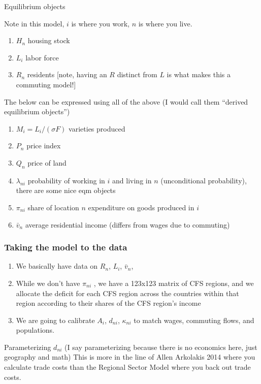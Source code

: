 \documentclass{article}
\begin{document}
Equilibrium objects

Note in this model, $i$ is where you work, $n$ is where you live.
\begin{enumerate}
\item $H_n$ housing stock
\item $L_i$ labor force
\item $R_n$ residents [note, having an $R$ distinct from $L$ is what makes this a commuting model!]
\end{enumerate}

The below can be expressed using all of the above (I would call them ``derived equilibrium objects'')
\begin{enumerate}
\item $M_i = L_i/(\sigma F)$ varieties produced
\item $P_n$ price index
\item $Q_n$ price of land
\item $\lambda_{ni}$ probability of working in $i$ and living in $n$ (unconditional probability), there are some nice eqm objects
\item $\pi_{ni}$ share of location $n$ expenditure on goods produced in $i$
\item $\bar v_n$ average residential income (differs from wages due to commuting)
\end{enumerate}

\subsubsection{Taking the model to the data}


\begin{enumerate}
    \item We basically have data on $R_n$, $L_i$, $\bar v_n$, 
    \item While we don't have $\pi_{ni}$ , we have a 123x123 matrix of CFS regions, and we allocate the deficit for each CFS region across the countries within that region according to their shares of the CFS region's income
\item  We are going to calibrate $A_i$, $d_{ni}$, $\kappa_{ni}$ to match wages, commuting flows, and populations.
\end{enumerate}

Parameterizing $d_{ni}$ (I say parameterizing because there is no economics here, just geography and math)
This is more in the line of Allen Arkolakis 2014 where you calculate trade costs than the Regional Sector Model where you back out trade costs.
\end{document}
